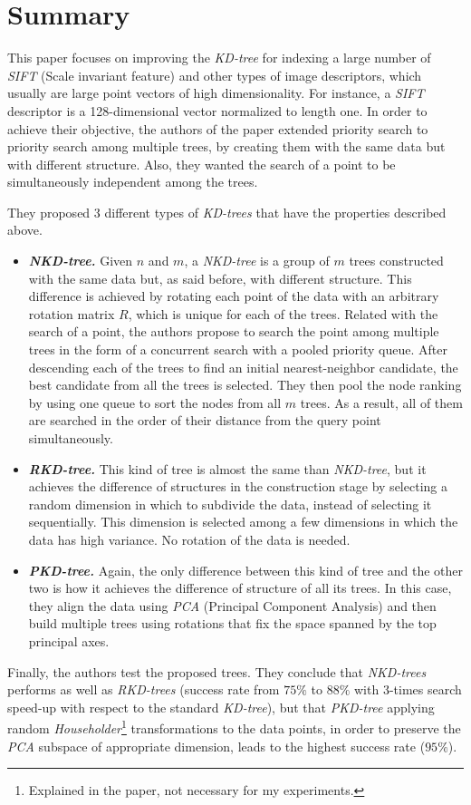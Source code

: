 \section{Summary}
\label{sec:summary}
This paper focuses on improving the \textit{KD-tree} for indexing a large number of \textit{SIFT} (Scale invariant feature) and other types of image descriptors, which usually are large point vectors of high dimensionality. For instance, a \textit{SIFT} descriptor is a 128-dimensional vector normalized to length one. In order to achieve their objective, the authors of the paper extended priority search to priority search among multiple trees, by creating them with the same data but with different structure. Also, they wanted the search of a point to be simultaneously independent among the trees.

They proposed 3 different types of \textit{KD-trees} that have the properties described above.
\begin{itemize}
    \item \textit{\textbf{NKD-tree.}} Given $n$ and $m$, a \textit{NKD-tree} is a group of $m$ trees constructed with the same data but, as said before, with different structure. This difference is achieved by rotating each point of the data with an arbitrary rotation matrix $R$, which is unique for each of the trees. Related with the search of a point, the authors propose to search the point among multiple trees in the form of a concurrent search with a pooled priority queue. After descending each of the trees to find an initial nearest-neighbor candidate, the best candidate from all the trees is selected. They then pool the node ranking by using one queue to sort the nodes from all $m$ trees. As a result, all of them are searched in the order of their distance from the query point simultaneously.
    \item \textit{\textbf{RKD-tree.}} This kind of tree is almost the same than \textit{NKD-tree}, but it achieves the difference of structures in the construction stage by selecting a random dimension in which to subdivide the data, instead of selecting it sequentially. This dimension is selected among a few dimensions in which the data has high variance. No rotation of the data is needed.
    \item \textit{\textbf{PKD-tree.}} Again, the only difference between this kind of tree and the other two is how it achieves the difference of structure of all its trees. In this case, they align the data using \textit{PCA} (Principal Component Analysis) and then build multiple trees using rotations that fix the space spanned by the top principal axes.
\end{itemize}

Finally, the authors test the proposed trees. They conclude that \textit{NKD-trees} performs as well as \textit{RKD-trees} (success rate from $75\%$ to $88\%$ with 3-times search speed-up with respect to the standard \textit{KD-tree}), but that \textit{PKD-tree} applying random \textit{Householder}\footnote{Explained in the paper, not necessary for my experiments.} transformations to the data points, in order to preserve the \textit{PCA} subspace of appropriate dimension, leads to the highest success rate ($95\%$).